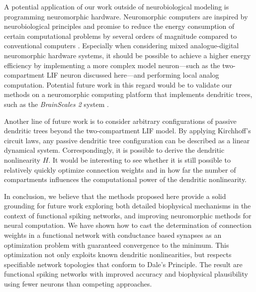 A potential application of our work outside of neurobiological modeling is programming neuromorphic hardware. Neuromorphic computers are inspired by neurobiological principles and promise to reduce the energy consumption of certain computational problems by several orders of magnitude compared to conventional computers \citep{boahen2017neuromorph}. Especially when considering mixed analogue-digital neuromorphic hardware systems, it should be possible to achieve a higher energy efficiency by implementing a more complex model neuron---such as the two-compartment LIF neuron discussed here---and performing local analog computation. Potential future work in this regard would be to validate our methods on a neuromorphic computing platform that implements dendritic trees, such as the \emph{BrainScales 2} system \citep{schemmel2017accelerated}.

Another line of future work is to consider arbitrary configurations of passive dendritic trees beyond the two-compartment LIF model. By applying Kirchhoff's circuit laws, any passive dendritic tree configuration can be described as a linear dynamical system. Correspondingly, it is possible to derive the dendritic nonlinearity $H$. It would be interesting to see whether it is still possible to relatively quickly optimize connection weights and in how far the number of compartments influences the computational power of the dendritic nonlinearity.

In conclusion, we believe that the methods proposed here provide a solid grounding for future work exploring both detailed biophysical mechanisms in the context of functional spiking networks, and improving neuromorphic methods for neural computation. We have shown how to cast the determination of connection weights in a functional network with conductance based synapses as an optimization problem with guaranteed convergence to the minimum. This optimization not only exploits known dendritic nonlinearities, but respects specifiable network topologies that conform to Dale's Principle. The result are functional spiking networks with improved accuracy and biophysical plausibility using fewer neurons than competing approaches.
